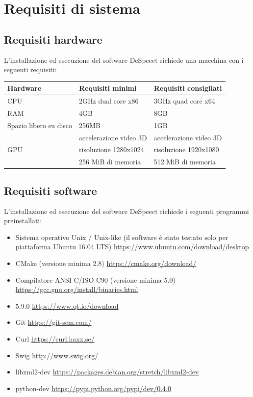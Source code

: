 \documentclass[openany,12pt,a4paper]{report}
\begin{document}
	\chapter{Requisiti di sistema}
	
	\section{Requisiti hardware}
	
	L'installazione ed esecuzione del software DeSpeect richiede una macchina con i seguenti requisiti:
	\begin{center}
		\begin{longtable}{| p{40mm} | p{60mm} | p{60mm} |}
			\hline
			\textbf{Hardware} & \textbf{Requisiti minimi} & \textbf{Requisiti consigliati} \\
			\hline CPU & 2GHz dual core x86 & 3GHz quad core x64 \\
			\hline RAM & 4GB & 8GB \\
			\hline Spazio libero su disco & 256MB & 1GB \\
			\hline  \multirow{3}{*}{GPU}
			& accelerazione video 3D & accelerazione video 3D \\ 
			& risoluzione 1280x1024 & risoluzione 1920x1080 \\
			& 256 MiB di memoria & 512 MiB di memoria \\
			\hline
		\end{longtable}
	\end{center}
	\section{Requisiti software}
	
	L'installazione ed esecuzione del software DeSpeect richiede i seguenti programmi preinstallati:
	
	\begin{itemize}
		\item Sistema operativo Unix / Unix-like (il software è stato testato solo per piattaforma Ubuntu 16.04 LTS)
			\subitem \url{https://www.ubuntu.com/download/desktop}
		\item CMake (versione minima 2.8)
			\subitem \url{https://cmake.org/download/}
		\item Compilatore ANSI C/ISO C90  (versione minima 5.0)
			\subitem \url{https://gcc.gnu.org/install/binaries.html}
		\item {} 5.9.0
			\subitem \url{https://www.qt.io/download}
		\item Git
			\subitem \url{https://git-scm.com/} 
		\item Curl 
			\subitem \url{https://curl.haxx.se/}
		\item Swig 
			\subitem \url{http://www.swig.org/}
		\item libxml2-dev
			\subitem \url{https://packages.debian.org/stretch/libxml2-dev} 
		\item python-dev
			\subitem \url{https://pypi.python.org/pypi/dev/0.4.0}
	\end{itemize}
\end{document}
